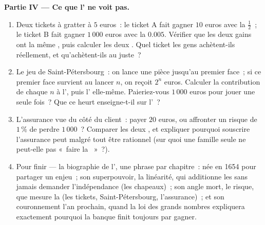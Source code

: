 \begin{problem}
\medskip
\noindent\textbf{Partie IV --- Ce que l' ne voit pas.}
\begin{enumerate}[resume]
  \item Deux tickets à gratter à $5$ euros~: le ticket A fait
        gagner $10$ euros avec la  $\frac12$~; le ticket
        B fait gagner $1\,000$ euros avec la  $0.005$.
        Vérifier que les deux gains ont la même , puis
        calculer les deux . Quel ticket les gens
        achètent-ils réellement, et qu'achètent-ils au juste~?
  \item Le jeu de Saint-Pétersbourg~: on lance une pièce jusqu'au
        premier face~; si ce premier face survient au lancer $n$, on
        reçoit $2^n$ euros. Calculer la contribution de chaque $n$ à
        l', puis l' elle-même. Paieriez-vous
        $1\,000$ euros pour jouer une seule fois~? Que ce heurt
        enseigne-t-il sur l'~?
  \item L'assurance vue du côté du client~: payer $20$ euros, ou
        affronter un risque de $1\,\%$ de perdre $1\,000$~? Comparer
        les deux , et expliquer pourquoi souscrire
        l'assurance peut malgré tout être rationnel (sur quoi une
        famille seule ne peut-elle pas «~faire la ~»~?).
  \item Pour finir --- la biographie de l', une phrase par
        chapitre~: née en 1654 pour partager un enjeu~; son
        superpouvoir, la linéarité, qui additionne les 
        sans jamais demander l'indépendance (les chapeaux)~; son
        angle mort, le risque, que mesure la  (les tickets,
        Saint-Pétersbourg, l'assurance)~; et son couronnement l'an
        prochain, quand la loi des grands nombres expliquera
        exactement pourquoi la banque finit toujours par gagner.
\end{enumerate}
\end{problem}
